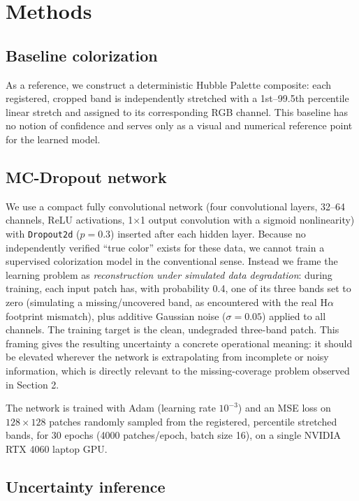 \documentclass[12pt]{article}
\begin{document}
\section{Methods}

\subsection{Baseline colorization}

As a reference, we construct a deterministic Hubble Palette composite: each
registered, cropped band is independently stretched with a 1st--99.5th
percentile linear stretch and assigned to its corresponding RGB channel.
This baseline has no notion of confidence and serves only as a visual and
numerical reference point for the learned model.

\subsection{MC-Dropout network}

We use a compact fully convolutional network (four convolutional layers,
32--64 channels, ReLU activations, 1$\times$1 output convolution with a
sigmoid nonlinearity) with \texttt{Dropout2d} ($p=0.3$) inserted after each
hidden layer. Because no independently verified ``true color'' exists for
these data, we cannot train a supervised colorization model in the
conventional sense. Instead we frame the learning problem as
\emph{reconstruction under simulated data degradation}: during training,
each input patch has, with probability 0.4, one of its three bands set to
zero (simulating a missing/uncovered band, as encountered with the real
H$\alpha$ footprint mismatch), plus additive Gaussian noise
($\sigma=0.05$) applied to all channels. The training target is the clean,
undegraded three-band patch. This framing gives the resulting uncertainty a
concrete operational meaning: it should be elevated wherever the network is
extrapolating from incomplete or noisy information, which is directly
relevant to the missing-coverage problem observed in Section 2.

The network is trained with Adam (learning rate $10^{-3}$) and an MSE loss
on $128\times128$ patches randomly sampled from the registered, percentile
stretched bands, for 30 epochs (4000 patches/epoch, batch size 16), on a
single NVIDIA RTX 4060 laptop GPU.

\subsection{Uncertainty inference}
\end{document}

